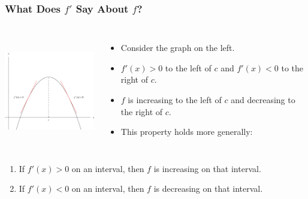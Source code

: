 \begin{frame}
\frametitle{What Does $f'$ Say About $f$?}
\begin{columns}[c]
\ \includegraphics[height=4cm]{curve-sketching/pictures/04-03-firstderiva.pdf}%
\begin{itemize}
\item  Consider the graph on the left. 
\item  $f'(x) > 0$ to the left of $c$ and $f'(x) < 0$ to the right of $c$.
\item  $f$ is increasing to the left of $c$ and decreasing to the right of $c$.
\item<2->  This property holds more generally:
\end{itemize}
\end{columns}
\begin{enumerate}
\item<2->  If $f'(x) > 0$ on an interval, then $f$ is increasing on that interval.
\item<2->  If $f'(x) < 0$ on an interval, then $f$ is decreasing on that interval.
\end{enumerate}
\end{frame}
